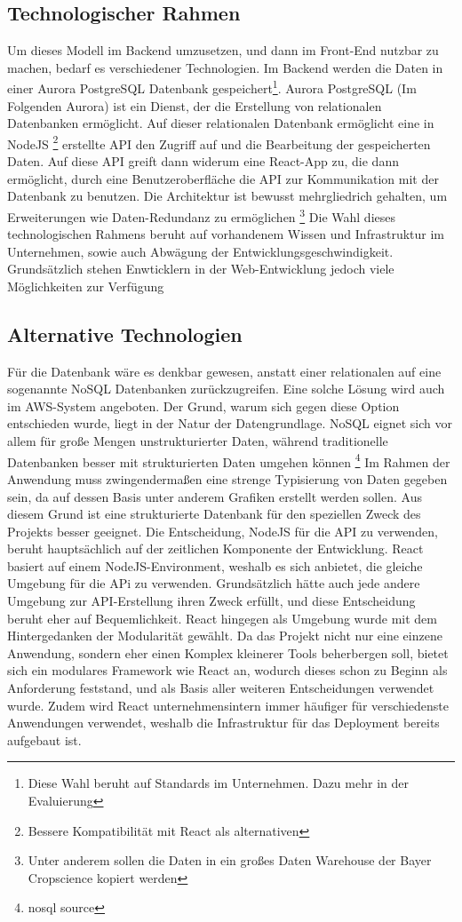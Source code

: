 \subsection{Technologischer Rahmen}
Um dieses Modell im Backend umzusetzen, und dann im Front-End nutzbar zu machen, bedarf es verschiedener Technologien.
Im Backend werden die Daten in einer Aurora PostgreSQL Datenbank gespeichert\footnote{Diese Wahl beruht auf Standards im Unternehmen. Dazu mehr in der Evaluierung}. 
Aurora PostgreSQL (Im Folgenden Aurora) ist ein Dienst, der die Erstellung von relationalen Datenbanken ermöglicht. Auf dieser relationalen Datenbank ermöglicht eine 
in NodeJS \footnote{Bessere Kompatibilität mit React als alternativen} erstellte API den Zugriff auf und die Bearbeitung der gespeicherten Daten.
Auf diese API greift dann widerum eine React-App zu, die dann ermöglicht, durch eine Benutzeroberfläche die API zur Kommunikation mit der Datenbank zu benutzen.
Die Architektur ist bewusst mehrgliedrich gehalten, um Erweiterungen wie Daten-Redundanz zu ermöglichen \footnote{Unter anderem sollen die Daten in ein großes Daten
Warehouse der Bayer Cropscience kopiert werden} Die Wahl dieses technologischen Rahmens beruht auf vorhandenem Wissen und Infrastruktur im Unternehmen, sowie auch 
Abwägung der Entwicklungsgeschwindigkeit. Grundsätzlich stehen Enwticklern in der Web-Entwicklung jedoch viele Möglichkeiten zur Verfügung
\subsection{Alternative Technologien}
Für die Datenbank wäre es denkbar gewesen, anstatt einer relationalen auf eine sogenannte NoSQL Datenbanken zurückzugreifen. Eine solche Lösung
wird auch im AWS-System angeboten. Der Grund, warum sich gegen diese Option entschieden wurde, liegt in der Natur der Datengrundlage. NoSQL eignet sich vor allem für 
große Mengen unstrukturierter Daten, während traditionelle Datenbanken besser mit strukturierten Daten umgehen können \footnote{nosql source}
Im Rahmen der Anwendung muss zwingendermaßen eine strenge Typisierung von Daten gegeben sein, da auf dessen Basis unter anderem Grafiken erstellt werden sollen. 
Aus diesem Grund ist eine strukturierte Datenbank für den speziellen Zweck des Projekts besser geeignet. 
\break
Die Entscheidung, NodeJS für die API zu verwenden, beruht hauptsächlich auf der zeitlichen Komponente der Entwicklung. React basiert auf einem NodeJS-Environment, weshalb
es sich anbietet, die gleiche Umgebung für die APi zu verwenden. Grundsätzlich hätte auch jede andere Umgebung zur API-Erstellung ihren Zweck erfüllt, und diese Entscheidung 
beruht eher auf Bequemlichkeit. React hingegen als Umgebung wurde mit dem Hintergedanken der Modularität gewählt. Da das Projekt nicht nur eine einzene Anwendung, sondern eher 
einen Komplex kleinerer Tools beherbergen soll, bietet sich ein modulares Framework wie React an, wodurch dieses schon zu Beginn als Anforderung feststand, und als Basis 
aller weiteren Entscheidungen verwendet wurde. Zudem wird React unternehmensintern immer häufiger für verschiedenste Anwendungen verwendet, weshalb die Infrastruktur für das 
Deployment bereits aufgebaut ist. 
